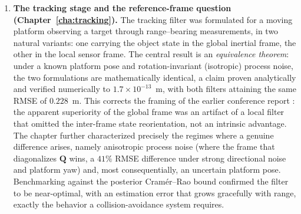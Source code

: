 \begin{enumerate}
  \item \textbf{The tracking stage and the reference-frame question
  (Chapter~\ref{cha:tracking}).}
  The tracking filter was formulated for a moving platform observing a
  target through range--bearing measurements, in two natural variants: one carrying
  the object state in the global inertial frame, the other in the local sensor
  frame. The central result is an \emph{equivalence theorem}: under a known
  platform pose and rotation-invariant (isotropic) process noise, the two
  formulations are mathematically identical, a claim proven analytically and
  verified numerically to $1.7\times10^{-13}$~m, with both filters attaining the
  same RMSE of $0.228$~m. This corrects the framing of the earlier conference
  report \cite{delima2025fusion}: the apparent superiority of the global frame was
  an artifact of a local filter that omitted the inter-frame state reorientation,
  not an intrinsic advantage. The chapter further characterized precisely the
  regimes where a genuine difference arises, namely anisotropic process noise
  (where the frame that diagonalizes $\bm{Q}$ wins, a $41\%$ RMSE difference under
  strong directional noise and platform yaw) and, most consequentially, an
  uncertain platform pose. Benchmarking against the posterior Cram\'er--Rao bound
  confirmed the filter to be near-optimal, with an estimation error that grows
  gracefully with range, exactly the behavior a collision-avoidance system
  requires.


\end{enumerate}
